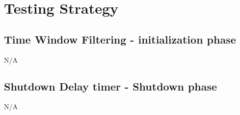 \chapter{Testing Strategy}
\section{Time Window Filtering - initialization phase}
N/A
\section{Shutdown Delay timer - Shutdown phase}
N/A